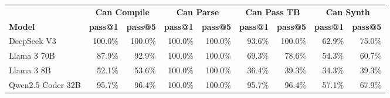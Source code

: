 \begin{tabular}{l|rr|rr|rr|rr}
\cmidrule[\heavyrulewidth]{2-9}
 & \multicolumn{2}{c|}{\textbf{Can Compile}} & \multicolumn{2}{c|}{\textbf{Can Parse}} & \multicolumn{2}{c|}{\textbf{Can Pass TB}} & \multicolumn{2}{c}{\textbf{Can Synth}} \\
\cmidrule(lr){2-3} \cmidrule(lr){4-5} \cmidrule(lr){6-7} \cmidrule(lr){8-9}
 \textbf{Model} & \textbf{pass@1} & \textbf{pass@5} & \textbf{pass@1} & \textbf{pass@5} & \textbf{pass@1} & \textbf{pass@5} & \textbf{pass@1} & \textbf{pass@5} \\
\midrule
DeepSeek V3 & 100.0\% & 100.0\% & 100.0\% & 100.0\% & 93.6\% & 100.0\% & 62.9\% & 75.0\% \\
Llama 3 70B & 87.9\% & 92.9\% & 100.0\% & 100.0\% & 69.3\% & 78.6\% & 54.3\% & 60.7\% \\
Llama 3 8B & 52.1\% & 53.6\% & 100.0\% & 100.0\% & 36.4\% & 39.3\% & 34.3\% & 39.3\% \\
Qwen2.5 Coder 32B & 95.7\% & 96.4\% & 100.0\% & 100.0\% & 95.7\% & 96.4\% & 57.1\% & 67.9\% \\
\bottomrule
\end{tabular}
